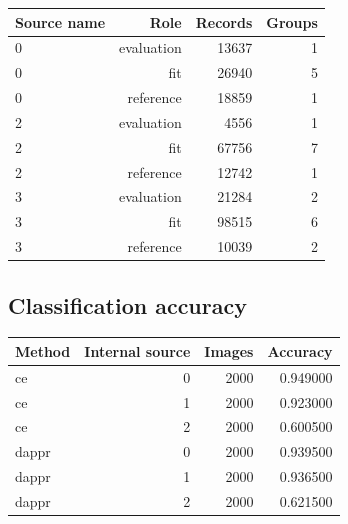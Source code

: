 \begingroup\small
\setlength{\tabcolsep}{4pt}
\begin{longtable}{lrrr}
\toprule

Source name & Role & Records & Groups\\\midrule\endhead

0 & evaluation & 13637 & 1\\

0 & fit & 26940 & 5\\

0 & reference & 18859 & 1\\

2 & evaluation & 4556 & 1\\

2 & fit & 67756 & 7\\

2 & reference & 12742 & 1\\

3 & evaluation & 21284 & 2\\

3 & fit & 98515 & 6\\

3 & reference & 10039 & 2\\

\bottomrule
\end{longtable}
\endgroup

\reservetable
\subsection{Classification accuracy}

\begingroup\small
\setlength{\tabcolsep}{4pt}
\begin{longtable}{lrrr}
\toprule

Method & Internal source & Images & Accuracy\\\midrule\endhead

ce & 0 & 2000 & 0.949000\\

ce & 1 & 2000 & 0.923000\\

ce & 2 & 2000 & 0.600500\\

dappr & 0 & 2000 & 0.939500\\

dappr & 1 & 2000 & 0.936500\\

dappr & 2 & 2000 & 0.621500\\

\bottomrule
\end{longtable}
\endgroup

